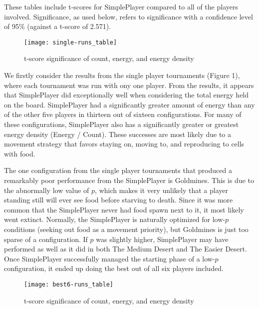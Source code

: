 \documentclass[
10pt, %
letterpaper, %
oneside, %
headinclude,footinclude, %
english
]{article}
\begin{document}
These tables include t-scores for SimplePlayer compared to all of the players involved. Significance, as used below, refers to significance with a confidence level of 95\% (against a t-score of 2.571).

\begin{figure}[h]
\centering
\texttt{[image: single-runs\_table]}
\caption[Table of t-score statistics for Single Run Tournaments]{t-score significance of count, energy, and energy density}
\label{fig:gallery2}
\end{figure}

We firstly consider the results from the single player tournaments (Figure 1), where each tournament was run with ony one player. From the results, it appears that SimplePlayer did exceptionally well when considering the total energy held on the board. SimplePlayer had a significantly greater amount of energy than any of the other five players in thirteen out of sixteen configurations. For many of these configurations, SimplePlayer also has a significantly greater or greatest energy density (Energy / Count). These successes are most likely due to a movement strategy that favors staying on, moving to, and reproducing to cells with food.

The one configuration from the single player tournaments that produced a remarkably poor performance from the SimplePlayer is Goldmines. This is due to the abnormally low value of $p$, which makes it very unlikely that a player standing still will ever see food before starving to death. Since it was more common that the SimplePlayer never had food spawn next to it, it most likely went extinct. Normally, the SimplePlayer is naturally optimized for low-$p$ conditions (seeking out food as a movement priority), but Goldmines is just too sparse of a configuration. If $p$ was slightly higher, SimplePlayer may have performed as well as it did in both The Medium Desert and The Easier Desert. Once SimplePlayer successfully managed the starting phase of a low-$p$ configuration, it ended up doing the best out of all six players included.

\pagebreak

\begin{figure}[h]
\centering
\texttt{[image: best6-runs\_table]}
\caption[Table of t-score statistics for Best Six Tournaments]{t-score significance of count, energy, and energy density}
\label{fig:gallery2}
\end{figure}
\end{document}
